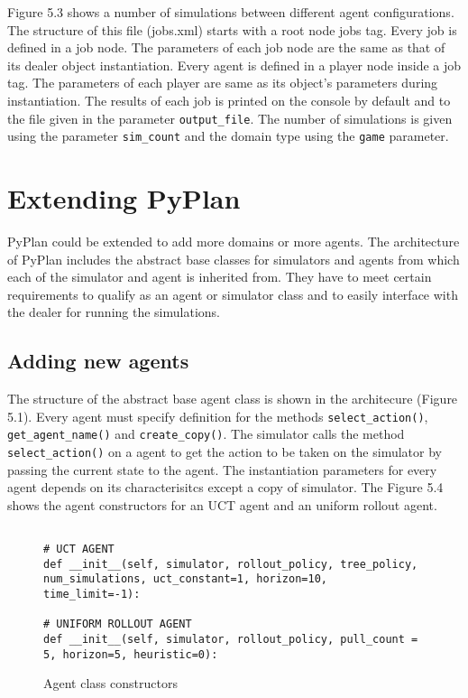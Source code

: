 \documentclass[double,12pt]{beavtex}
\begin{document}
Figure 5.3 shows a number of simulations between different agent configurations. The structure of this file (jobs.xml) starts with a root node jobs tag. Every job is defined in a job node. The parameters of each job node are the same as that of its dealer object instantiation. Every agent is defined in a player node inside a job tag. The parameters of each player are same as its object's parameters during instantiation. The results of each job is printed on the console by default and to the file given in the parameter \verb|output_file|. The number of simulations is given using the parameter \verb|sim_count| and the domain type using the \verb|game| parameter.

\section{Extending PyPlan}
PyPlan could be extended to add more domains or more agents. The architecture of PyPlan includes the abstract base classes for simulators and agents from which each of the simulator and agent is inherited from. They have to meet certain requirements to qualify as an agent or simulator class and to easily interface with the dealer for running the simulations. 

\subsection{Adding new agents}
The structure of the abstract base agent class is shown in the architecure (Figure 5.1). Every agent must specify definition for the methods \verb|select_action()|, \verb|get_agent_name()| and \verb|create_copy()|. The simulator calls the method \verb|select_action()| on a agent to get the action to be taken on the simulator by passing the current state to the agent. The instantiation parameters for every agent depends on its characterisitcs except a copy of simulator. The Figure 5.4 shows the agent constructors for an UCT agent and an uniform rollout agent. 

\begin{figure}[!ht]
\begin{lstlisting}

# UCT AGENT
def __init__(self, simulator, rollout_policy, tree_policy, num_simulations, uct_constant=1, horizon=10, time_limit=-1):

# UNIFORM ROLLOUT AGENT
def __init__(self, simulator, rollout_policy, pull_count = 5, horizon=5, heuristic=0):
\end{lstlisting}
\caption{Agent class constructors}
\end{figure}
\end{document}
